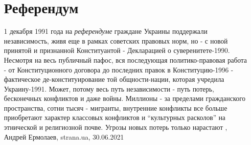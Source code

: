 
 
 
 
 
\chapter{Референдум}

1 декабря 1991 года на \emph{референдуме} граждане Украины поддержали независимость,
живя еще в рамках советских правовых норм, но - с новой принятой и признанной
Конституантой - Декларацией о суверенитете-1990.  Несмотря на весь публичный
пафос, вся последующая политико-правовая работа - от Конституционного договора
до последних правок в Конституцию-1996 - фактическое де-конституирование той
общности-нации, которая учредила Украину-1991. Может, потому весь путь
независимости - путь потерь, бесконечных конфликтов и даже войны. Миллионы - за
пределами гражданского пространства, сотни тысяч - мигранты, внутренние
конфликты все больше приобретают характер классовых конфликтов и \enquote{культурных
расколов} на этнической и религиозной почве. Угрозы новых потерь только
нарастают
, 
Андрей Ермолаев, strana.ua, 30.06.2021

